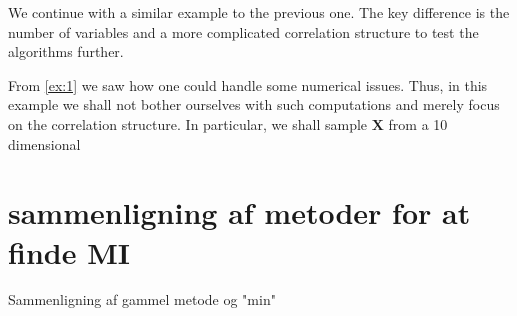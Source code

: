 \documentclass[../Thesis.tex]{subfiles}
\begin{document}
We continue with a similar example to the previous one. The key difference is the number of variables and a more complicated correlation structure to test the algorithms further.
\begin{example}
    From \autoref{ex:1} we saw how one could handle some numerical issues. Thus, in this example we shall not bother ourselves with such computations and merely focus on the correlation structure. In particular, we shall sample $\boldsymbol X$ from a 10 dimensional
\end{example}


\newpage

\section{sammenligning af metoder for at finde MI}
Sammenligning af gammel metode og "min"
\end{document}
